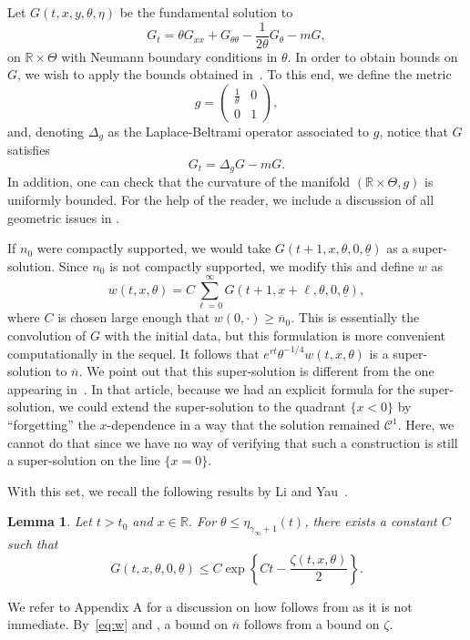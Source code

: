 \documentclass[11pt]{article}    %
\newtheorem{lemma}[theorem]{Lemma}
\newcommand{\R}{\mathbb{R}}
\begin{document}
Let $G(t,x,y,\theta,\eta)$ be the fundamental solution to
\begin{equation}\label{eq:G_pde}
	G_t = \theta G_{xx} + G_{\theta\theta} - \frac{1}{2\theta} G_\theta - m G,
\end{equation}
on $\R\times \Theta$ with Neumann boundary conditions in $\theta$.  In order to obtain bounds on $G$, we wish to apply the bounds obtained in~\cite{LiYau}.  To this end, we define the metric
\begin{equation}\label{eq:metric}
	g = \begin{pmatrix}
		\frac{1}{\theta} & 0 \\ 0 & 1
		\end{pmatrix},
\end{equation}
and, denoting $\Delta_g$ as the Laplace-Beltrami operator associated to $g$, notice that $G$ satisfies
\[
	G_t = \Delta_g G - mG.
\]
In addition, one can check that the curvature of the manifold $(\R\times\Theta, g)$ is uniformly bounded. For the help of the reader, we include a discussion of all geometric issues in .






If $n_0$ were compactly supported, we would take $G(t+1,x,\theta,0,\underline\theta)$ as a super-solution.  Since $n_0$ is not compactly supported, we modify this and define $w$ as
\begin{equation}\label{eq:w}
	w(t,x,\theta)
		= C \sum_{\ell=0}^\infty G(t+1, x + \ell ,\theta,0,\underline\theta),
\end{equation}
where $C$ is chosen large enough that $w(0,\cdot) \geq \overline n_0$.  This is essentially the convolution of $G$ with the initial data, but this formulation is more convenient computationally in the sequel.  It follows that $e^{rt}\theta^{-1/4} w(t,x,\theta)$ is a super-solution to $\overline n$.  We point out that this super-solution is different from the one appearing in~\cite{BHR_Acceleration}.  In that article, because we had an explicit formula for the super-solution, we could extend the super-solution to the quadrant $\{x<0\}$ by ``forgetting'' the $x$-dependence in a way that the solution remained $\mathcal{C}^1$.  Here, we cannot do that since we have no way of verifying that such a construction is still a super-solution on the line $\{x = 0\}$.

With this set, we recall the following results by Li and Yau~\cite[Corollary~3.2]{LiYau}.

\begin{lemma}\label{lem:Li_Yau}
Let $t>t_0$ and $x \in \R$. For $\theta \leq \eta_{\gamma_\infty + 1}(t)$, there exists a constant $C$ such that
\[
	G(t,x,\theta,0,\underline\theta) \leq C \exp \left\{ C t - \frac{\zeta(t,x,\theta)}{2}\right\}.
\]
\end{lemma}
We refer to Appendix A for a discussion on how  follows from \cite[Corollary~3.2]{LiYau} as it is not immediate.  By~\eqref{eq:w} and , a bound on $\overline n$ follows from a bound on $\zeta$.
\end{document}
